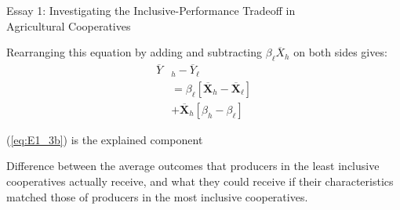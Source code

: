 \documentclass[aspectratio=169]{beamer}
\newenvironment{wideitemize}{\itemize\addtolength{\itemsep}{10pt}}{\enditemize}
\begin{document}
\begin{frame}{Essay 1: Investigating the Inclusive-Performance Tradeoff in \\ \hspace{1.7cm} Agricultural Cooperatives}
    \begin{wideitemize}
        \item Rearranging this equation by adding and subtracting $\beta_{\ell}\overline{X}_{h}$ on both sides gives: \vspace{.25cm}
            \begin{subequations}
                \begin{align}
                \overline{Y}&_{h} - \overline{Y}_{\ell} \label{eq:E1_3a} \\
                &= \beta_{\ell}[\overline{\mathbf{X}}_{h} - \overline{\mathbf{X}}_{\ell}] \label{eq:E1_3b} \\
                &+ \overline{\mathbf{X}}_{h}[\beta_{h} - \beta_{\ell}] \label{eq:E1_3c}
                \end{align}
            \end{subequations}  
        \item (\ref{eq:E1_3b}) is the explained component \vspace{.25cm}
            \begin{wideitemize}
                \item Difference between the average outcomes that producers in the least inclusive cooperatives actually receive, and what they could receive if their characteristics matched those of producers in the most inclusive cooperatives.
            \end{wideitemize}
    \end{wideitemize}    
\end{frame}
\end{document}
